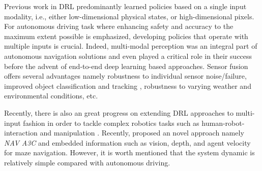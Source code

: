 \documentclass[../thesis.tex]{subfiles}
\begin{document}
Previous work in DRL predominantly learned policies based on a single input modality, i.e., either low-dimensional physical states, or high-dimensional pixels. For autonomous driving task where enhancing safety and accuracy to the maximum extent possible is emphasized, developing policies that operate with multiple inputs is crucial. Indeed, multi-modal perception was an integral part of autonomous navigation solutions and even played a critical role in their success \cite{multimodaltartan} before the advent of end-to-end deep learning based approaches. Sensor fusion offers several advantages namely robustness to individual sensor noise/failure, improved object classification and tracking \cite{elfring2016multisensor, cho2014multi, darms2008classification}, robustness to varying weather and environmental conditions, etc. 

Recently, there is also an great progress on extending DRL approaches to multi-input fashion in order to tackle complex robotics tasks such as human-robot-interaction \cite{qureshi2016robot} and manipulation \cite{levine2016end}. Recently, \citet{mirowski2017a} proposed an novel approach namely \textit{NAV A3C} and embedded information such as vision, depth, and agent velocity for maze navigation. However, it is worth mentioned that the system dynamic is relatively simple compared with autonomous driving.
\end{document}
